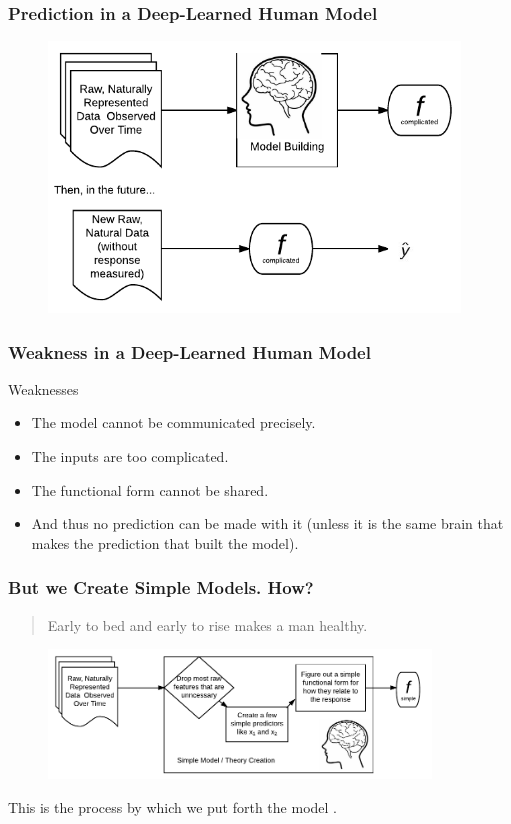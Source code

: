 \documentclass[handout]{beamer}
\begin{document}
\begin{frame}\frametitle{Prediction in a Deep-Learned Human Model}


\begin{figure}
\centering
\includegraphics[width=4.3in]{human_learning_weakness}
\end{figure}

\end{frame}

\begin{frame}\frametitle{Weakness in a Deep-Learned Human Model}

\begin{block}{Weaknesses}
\begin{itemize}
\item The model cannot be communicated precisely. \pause 
\item The inputs are too complicated. \pause 
\item The functional form cannot be shared. \pause 
\item And thus no prediction can be made with it (unless it is the same brain that makes the prediction that built the model).
\end{itemize}
\end{block}


	
\end{frame}

\begin{frame}\frametitle{But we Create Simple Models. How?}

\begin{quotation}
Early to bed and early to rise makes a man healthy.
\end{quotation}

\begin{figure}
\centering
\includegraphics[width=4in]{human_simple_model_learning}
\end{figure}
 \pause 
This is the process by which we put forth the model .

\end{frame}
\end{document}
